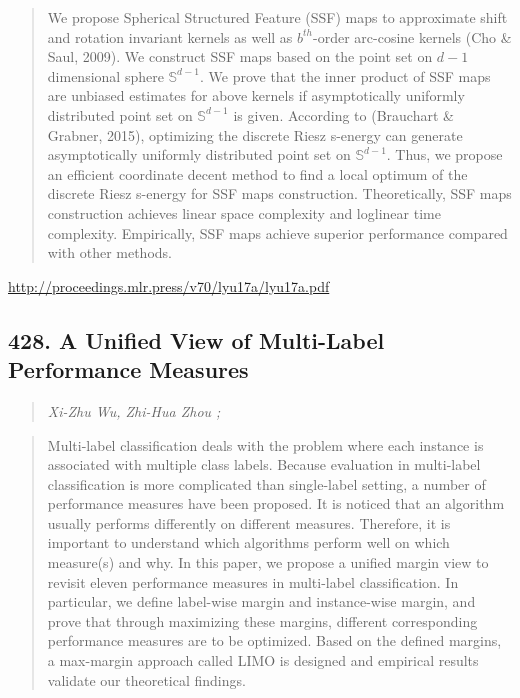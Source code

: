 \documentclass{article}
\begin{document}
\begin{quote}
    We propose Spherical Structured Feature (SSF) maps to approximate shift and rotation invariant kernels as well as $b^{th}$-order arc-cosine kernels (Cho \& Saul, 2009). We construct SSF maps based on the point set on $d-1$ dimensional sphere $\mathbb{S}^{d-1}$. We prove that the inner product of SSF maps are unbiased estimates for above kernels if asymptotically uniformly distributed point set on $\mathbb{S}^{d-1}$ is given. According to (Brauchart \& Grabner, 2015), optimizing the discrete Riesz s-energy can generate asymptotically uniformly distributed point set on $\mathbb{S}^{d-1}$. Thus, we propose an efficient coordinate decent method to find a local optimum of the discrete Riesz s-energy for SSF maps construction. Theoretically, SSF maps construction achieves linear space complexity and loglinear time complexity. Empirically, SSF maps achieve superior performance compared with other methods.  \end{quote}

\href{http://proceedings.mlr.press/v70/lyu17a/lyu17a.pdf}{http://proceedings.mlr.press/v70/lyu17a/lyu17a.pdf}

\subsection{428. A Unified View of Multi-Label Performance Measures}

\begin{quote}
\footnotesize{\textit{Xi-Zhu Wu, Zhi-Hua Zhou ;}}
\end{quote}

\begin{quote}
    Multi-label classification deals with the problem where each instance is associated with multiple class labels. Because evaluation in multi-label classification is more complicated than single-label setting, a number of performance measures have been proposed. It is noticed that an algorithm usually performs differently on different measures. Therefore, it is important to understand which algorithms perform well on which measure(s) and why. In this paper, we propose a unified margin view to revisit eleven performance measures in multi-label classification. In particular, we define label-wise margin and instance-wise margin, and prove that through maximizing these margins, different corresponding performance measures are to be optimized. Based on the defined margins, a max-margin approach called LIMO is designed and empirical results validate our theoretical findings.  \end{quote}
\end{document}
